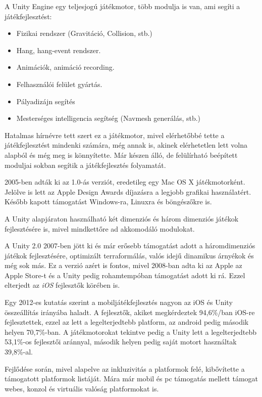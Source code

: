 \documentclass[]{thesis-ekf}
\theoremstyle{definition}
\begin{document}
	A Unity Engine egy teljesjogú játékmotor, több modulja is van, ami segíti a játékfejlesztést:
	
	\begin{itemize}
		\item Fizikai rendszer (Gravitáció, Collision, stb.)
		\item Hang, hang-event rendszer.
		\item Animációk, animáció recording.
		\item Felhasználói felület gyártás.
		\item Pályadizájn segítés
		\item Mesterséges intelligencia segítség (Navmesh generálás, stb.)
	\end{itemize}
	
	Hatalmas hírnévre tett szert ez a játékmotor, mivel elérhetőbbé tette a játékfejlesztést mindenki számára, még annak is, akinek elérhetetlen lett volna alapból és még meg is könnyítette. Már készen álló, de felülírható beépített moduljai sokban segítik a játékfejlesztés folyamatát.
	
	2005-ben adták ki az 1.0-ás verziót, eredetileg egy Mac OS X játékmotorként. Jelölve is lett az Apple Design Awards díjazásra a legjobb grafikai használatért. Később kapott támogatást Windows-ra, Linuxra és böngészőkre is.
	
	A Unity alapjáraton használható két dimenziós és három dimenziós játékok fejlesztésére is, mivel mindkettőre ad akkomodáló modulokat.
	
	A Unity 2.0 2007-ben jött ki és már erősebb támogatást adott a háromdimenziós játékok fejlesztésére, optimizált terraformálás, valós idejű dinamikus árnyékok és még sok más. Ez a verzió azért is fontos, mivel 2008-ban adta ki az Apple az Apple Store-t és a Unity pedig rohamtempóban támogatást adott ki rá. Ezzel elterjedt az \emph{iOS} fejlesztők körében is.
	
	Egy 2012-es kutatás szerint\cite{unitysurvey} a mobiljátékfejlesztés nagyon az iOS és Unity összeállítás irányába haladt. A fejlesztők, akiket megkérdeztek 94,6\%/ban iOS-re fejlesztettek, ezzel az lett a legelterjedtebb platform, az android pedig második helyen 70,7\%-ban. A játékmotorokat tekintve pedig a Unity lett a legelterjedtebb 53,1\%-os fejlesztői aránnyal, második helyen pedig saját motort használtak 39,8\%-al.
	
	Fejlődése során, mivel alapelve az inkluzivitás a platformok felé, kibővítette a támogatott platformok listáját. Mára már mobil és pc támogatás mellett támogat webes, konzol és virtuális valóság platformokat is.
	
\end{document}
